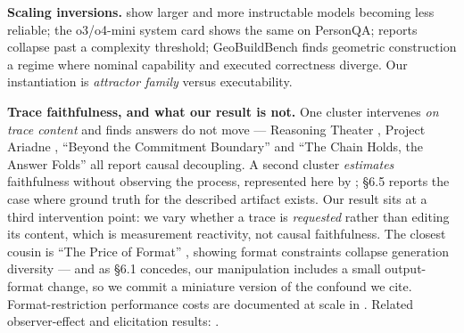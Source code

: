 \textbf{Scaling inversions.} \citet{zhou2024reliability} show larger and more instructable models
becoming less reliable; the o3/o4-mini system card \citep{openai2025o3o4systemcard} shows the same on PersonQA; \citet{shojaee2025illusionthinkingunderstandingstrengths}
reports collapse past a complexity threshold; GeoBuildBench \citep{kim2026geobuildbenchbenchmarkinteractiveexecutable} finds geometric
construction a regime where nominal capability and executed correctness diverge. Our
instantiation is \emph{attractor family} versus executability.

\textbf{Trace faithfulness, and what our result is not.} One cluster intervenes \emph{on trace content}
and finds answers do not move --- Reasoning Theater \citep{boppana2026reasoningtheaterdisentanglingmodel}, Project Ariadne \citep{khanzadeh2026projectariadnestructuralcausal},
``Beyond the Commitment Boundary'' \citep{scalena2026commitmentboundaryprobingepiphenomenal} and ``The Chain Holds, the Answer Folds''
\citep{li2026chainholdsanswerfolds} all report causal decoupling. A second cluster \emph{estimates} faithfulness without
observing the process, represented here by \citet{arcuschin2026chainofthoughtreasoningwildfaithful}; \S6.5 reports the case where ground truth
for the described artifact exists. Our result sits at a third intervention point: we vary
whether a trace is \emph{requested} rather than editing its content, which is measurement reactivity,
not causal faithfulness. The closest cousin is ``The Price of Format'' \citep{yun2025priceformatdiversitycollapse}, showing
format constraints collapse generation diversity --- and as \S6.1 concedes, our manipulation
includes a small output-format change, so we commit a miniature version of the confound we cite.
Format-restriction performance costs are documented at scale in \citet{tam2024letspeakfreelystudy}. Related observer-effect and elicitation results:
\citep{abdelnabi2025hawthorneeffectreasoningmodels,zhang2026verbalizedsamplingmitigatemode,wu2025answercentricreasoningdrivenuncoveringlatent}.

